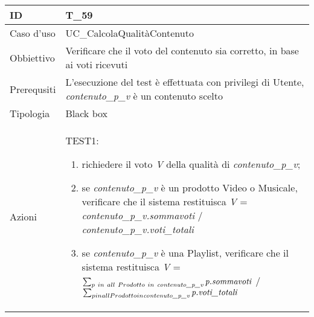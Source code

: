 \begin{table}[hb]
    \centering
    \begin{tabular}{ |p{2cm}|p{10cm}|  }
        \hline
        ID          & T\_59                                                             \\\hline
        Caso d'uso  & UC\_CalcolaQualitàContenuto                                             \\\hline
        Obbiettivo  & Verificare che il voto del contenuto sia corretto, in base ai voti ricevuti \\\hline
        Prerequsiti & L'esecuzione del test è effettuata con privilegi di Utente, \emph{contenuto\_p\_v} 
        è un contenuto scelto \\\hline
        Tipologia   & Black box                                                          \\\hline
        Azioni      &
        TEST1:
        \begin{enumerate}[nosep, topsep=0pt]
            \item richiedere il voto \emph{V} della qualità di \emph{contenuto\_p\_v};
            \item se \emph{contenuto\_p\_v} è un prodotto Video o Musicale,
            verificare che il sistema restituisca \emph{V} = \emph{contenuto\_p\_v.sommavoti} / \emph{contenuto\_p\_v.voti\_totali}
            \item se \emph{contenuto\_p\_v} è una Playlist,
            verificare che il sistema restituisca \emph{V} = 
            $\sum_{p\ in\ all\ Prodotto\ in\ \emph{contenuto\_p\_v}} \emph{p.sommavoti}$ 
            /
            $\sum_{p in all Prodotto in \emph{contenuto\_p\_v}} \emph{p.voti\_totali}$
        \end{enumerate}
        \\\hline
    \end{tabular}
\end{table}

